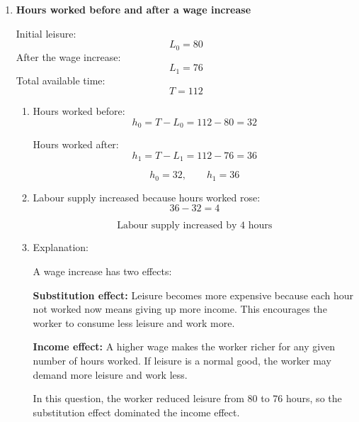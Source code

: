 \documentclass[12pt]{article}
\begin{document}
\begin{enumerate}
\begin{enumerate}[label=(\alph*)]
    Interpretation: one extra hour of leisure reduces income by \(\$18\), which is the wage.

    \item If the wage rises to \(\$24\):

    New budget line:
    \[
    C=24(112-L)+240
    \]
    \[
    C=2688-24L+240
    \]
    \[
    \boxed{C=2928-24L}
    \]

    The new income intercept is:
    \[
    C=2928 \quad \text{when } L=0
    \]
    The leisure intercept remains:
    \[
    L=112
    \]
    The slope becomes steeper:
    \[
    \boxed{-24}
    \]

    So the budget line rotates outward around the leisure intercept.
\end{enumerate}


\item \textbf{Hours worked before and after a wage increase}

Initial leisure:
\[
L_0=80
\]
After the wage increase:
\[
L_1=76
\]
Total available time:
\[
T=112
\]

\begin{enumerate}[label=(\alph*)]
    \item Hours worked before:
    \[
    h_0=T-L_0=112-80=32
    \]

    Hours worked after:
    \[
    h_1=T-L_1=112-76=36
    \]

    \[
    \boxed{h_0=32,\qquad h_1=36}
    \]

    \item Labour supply increased because hours worked rose:
    \[
    36-32=4
    \]

    \[
    \boxed{\text{Labour supply increased by 4 hours}}
    \]

    \item Explanation:

    A wage increase has two effects:

    \textbf{Substitution effect:}
    Leisure becomes more expensive because each hour not worked now means giving up more income. This encourages the worker to consume less leisure and work more.

    \textbf{Income effect:}
    A higher wage makes the worker richer for any given number of hours worked. If leisure is a normal good, the worker may demand more leisure and work less.

    In this question, the worker reduced leisure from 80 to 76 hours, so the substitution effect dominated the income effect.
\end{enumerate}


\end{enumerate}
\end{document}
